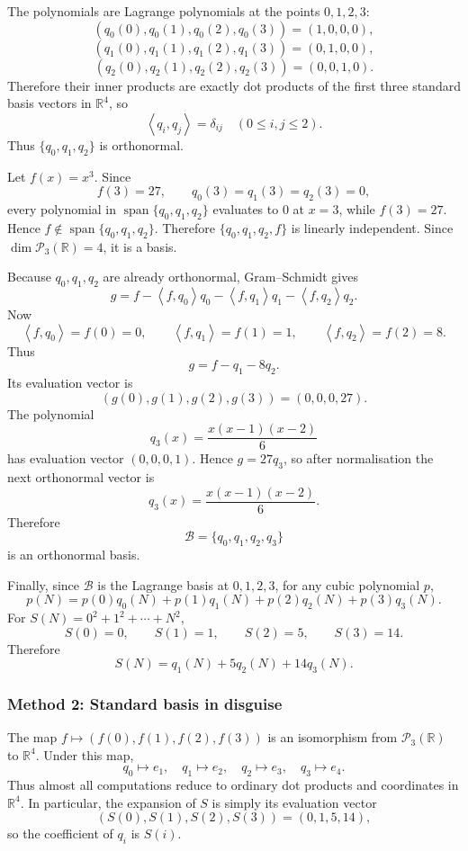\documentclass[12pt]{article}
\newcommand{\R}{\mathbb{R}}
\newcommand{\B}{\mathcal{B}}
\newcommand{\Ppoly}{\mathcal{P}}
\newcommand{\Span}{\operatorname{span}}
\newcommand{\ip}[2]{\left\langle #1,#2\right\rangle}
\begin{document}
The polynomials are Lagrange polynomials at the points $0,1,2,3$:
\[
(q_0(0),q_0(1),q_0(2),q_0(3))=(1,0,0,0),
\]
\[
(q_1(0),q_1(1),q_1(2),q_1(3))=(0,1,0,0),
\]
\[
(q_2(0),q_2(1),q_2(2),q_2(3))=(0,0,1,0).
\]
Therefore their inner products are exactly dot products of the first three standard basis vectors in $\R^4$, so
\[
\boxed{\ip{q_i}{q_j}=\delta_{ij}\quad(0\le i,j\le2).}
\]
Thus $\{q_0,q_1,q_2\}$ is orthonormal.

Let $f(x)=x^3$. Since
\[
f(3)=27,
\qquad
q_0(3)=q_1(3)=q_2(3)=0,
\]
every polynomial in $\Span\{q_0,q_1,q_2\}$ evaluates to $0$ at $x=3$, while $f(3)=27$. Hence $f\notin\Span\{q_0,q_1,q_2\}$. Therefore $\{q_0,q_1,q_2,f\}$ is linearly independent. Since $\dim\Ppoly_3(\R)=4$, it is a basis.

Because $q_0,q_1,q_2$ are already orthonormal, Gram--Schmidt gives
\[
g=f-\ip{f}{q_0}q_0-\ip{f}{q_1}q_1-\ip{f}{q_2}q_2.
\]
Now
\[
\ip{f}{q_0}=f(0)=0,
\qquad
\ip{f}{q_1}=f(1)=1,
\qquad
\ip{f}{q_2}=f(2)=8.
\]
Thus
\[
g=f-q_1-8q_2.
\]
Its evaluation vector is
\[
(g(0),g(1),g(2),g(3))=(0,0,0,27).
\]
The polynomial
\[
q_3(x)=\frac{x(x-1)(x-2)}6
\]
has evaluation vector $(0,0,0,1)$. Hence $g=27q_3$, so after normalisation the next orthonormal vector is
\[
\boxed{q_3(x)=\frac{x(x-1)(x-2)}6.}
\]
Therefore
\[
\boxed{\B=\{q_0,q_1,q_2,q_3\}}
\]
is an orthonormal basis.

Finally, since $\B$ is the Lagrange basis at $0,1,2,3$, for any cubic polynomial $p$,
\[
p(N)=p(0)q_0(N)+p(1)q_1(N)+p(2)q_2(N)+p(3)q_3(N).
\]
For $S(N)=0^2+1^2+\cdots+N^2$,
\[
S(0)=0,
\qquad
S(1)=1,
\qquad
S(2)=5,
\qquad
S(3)=14.
\]
Therefore
\[
\boxed{S(N)=q_1(N)+5q_2(N)+14q_3(N).}
\]

\subsubsection{Method 2: Standard basis in disguise}
The map $f\mapsto (f(0),f(1),f(2),f(3))$ is an isomorphism from $\Ppoly_3(\R)$ to $\R^4$. Under this map,
\[
q_0\mapsto e_1,
\quad
q_1\mapsto e_2,
\quad
q_2\mapsto e_3,
\quad
q_3\mapsto e_4.
\]
Thus almost all computations reduce to ordinary dot products and coordinates in $\R^4$. In particular, the expansion of $S$ is simply its evaluation vector
\[
(S(0),S(1),S(2),S(3))=(0,1,5,14),
\]
so the coefficient of $q_i$ is $S(i)$.
\end{document}
